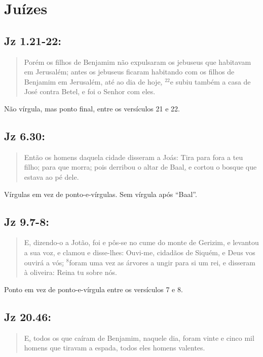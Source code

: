 \section{Juízes}
\subsection{Jz 1.21-22:}
\begin{quote}
    \small
    Porém os filhos de Benjamim não expulsaram os jebuseus que habitavam em Jerusalém; antes os jebuseus ficaram habitando com os filhos de Benjamim em Jerusalém, até ao dia de hoje\uline{,} $^{\mathrm{22}}$e subiu também a casa de José contra Betel, e foi o Senhor com eles.
\end{quote}

Não vírgula, mas ponto final, entre os versículos 21 e 22.

\subsection{Jz 6.30:}
\begin{quote}
    \small
    Então os homens daquela cidade disseram a Joás: Tira para fora a teu filho\uline{;} para que morra\uline{;} pois derribou o altar de Baal\uline{,} e cortou o bosque que estava ao pé dele.
\end{quote}

Vírgulas em vez de ponto-e-vírgulas. Sem vírgula após ``Baal''.

\subsection{Jz 9.7-8:}
\begin{quote}
    \small
    E, dizendo-o a Jotão, foi e pôs-se no cume do monte de Gerizim, e levantou a sua voz, e clamou e disse-lhes: Ouvi-me, cidadãos de Siquém, e Deus vos ouvirá a vós\uline{;} $^{\mathrm{8}}$foram uma vez as árvores a ungir para si um rei, e disseram à oliveira: Reina tu sobre nós.
\end{quote}

Ponto em vez de ponto-e-vírgula entre os versículos 7 e 8.

\subsection{Jz 20.46:}
\begin{quote}
    \small
   E\uline{,} todos os que caíram de Benjamim, naquele dia, foram vinte e cinco mil homens que tiravam a espada, todos eles homens valentes. 
\end{quote}

